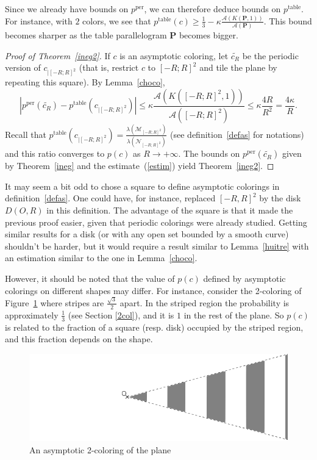 \documentclass[a4paper,11pt]{article}
\theoremstyle{definition}
\theoremstyle{remark}
\newcommand{\M}{\mathcal{M}}
\newcommand{\N}{\mathcal{N}}
\newcommand{\pper}{p^{\mathrm{per}}}
\newcommand{\ptable}{p^{\mathrm{table}}}
\begin{document}
Since we already have bounds on $\pper$, we can therefore deduce bounds on $\ptable$.
For instance, with $2$ colors, we see that 
$\ptable(c) \geq \frac13 - \kappa \frac{\mathcal{A}(K(\mathbf{P},1))}{\mathcal{A}(\mathbf{P})}$. 
This bound becomes sharper as the table parallelogram $\mathbf{P}$ becomes bigger.
\begin{proof}[Proof of Theorem~\ref{ineg2}]
If $c$ is an asymptotic coloring, let $\tilde{c_R}$ be the periodic version of $c_{|[-R;R]^2}$ (that is, restrict $c$ to $[-R;R]^2$ and tile the plane by repeating this square). By Lemma~\ref{choco},
\begin{equation} \label{estim}
|\pper(\tilde{c_R}) - \ptable(c_{|[-R;R]^2}) | \leq \kappa \frac{\mathcal{A}(K([-R;R]^2,1))}{\mathcal{A}([-R;R]^2)} \leq \kappa \frac{4R}{R^2} = \frac{4\kappa}{R}.
\end{equation}
Recall that $\ptable(c_{|[-R;R]^2}) = \frac{\lambda (\M_{[-R;R]^2})}{\lambda (\N_{[-R;R]^2})}$ (see definition~\ref{defas} for notations) and this ratio converges to $p(c)$ as $R\rightarrow +\infty$. The bounds on $\pper(\tilde{c_R})$ given by Theorem~\ref{ineg} and the estimate~(\ref{estim}) yield Theorem~\ref{ineg2}.
\end{proof}

It may seem a bit odd to chose a square to define asymptotic colorings in definition~\ref{defas}. One could have, for instance, replaced $[-R,R]^2$ by the disk $D(O,R)$ in this definition. The advantage of the square is that it made the previous proof easier, given that periodic colorings were already studied. Getting similar results for a disk (or with any open set bounded by a smooth curve) shouldn't be harder, but it would require a result similar to Lemma~\ref{huitre} with an estimation similar to the one in Lemma~\ref{choco}.

However, it should be noted that the value of $p(c)$ defined by asymptotic colorings on different shapes may differ. For instance, consider the 2-coloring of Figure~\ref{contrex} where stripes are $\frac{\sqrt{3}}{2}$ apart. In the striped region the probability is approximately $\frac13$ (see Section \ref{2col}), and it is $1$ in the rest of the plane. So $p(c)$ is related to the fraction of a square (resp. disk) occupied by the striped region, and this fraction depends on the shape.

\begin{figure}[!ht]
\center
\includegraphics[scale=0.45]{contrex.png}
\caption{\label{contrex} An asymptotic 2-coloring of the plane}
\end{figure}
\end{document}
